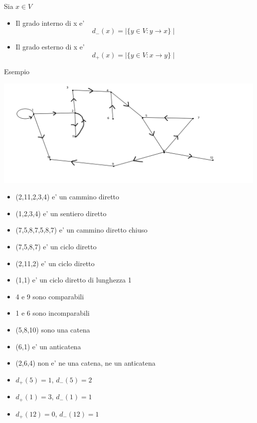 \documentclass{article}
\begin{document}
        \begin{flushleft}
          Sia $x\in V$
        \end{flushleft}
        \begin{itemize}
          \item Il grado interno di x e'
            \begin{equation*}
              d_-(x)=\mid \{ y\in V:y \to x\} \mid
            \end{equation*}
          \item Il grado esterno di x e'
            \begin{equation*}
              d_+(x)=\mid \{y\in V:x\to y\} \mid
            \end{equation*}
        \end{itemize}
        \begin{flushleft}
          Esempio 
        \end{flushleft}
        \includegraphics[bb=0 0 400 200]{pic/grafodirettoes.png}
        \begin{itemize}
          \item (2,11,2,3,4) e' un cammino diretto
          \item (1,2,3,4) e' un sentiero diretto
          \item (7,5,8,7,5,8,7) e' un cammino diretto chiuso
          \item (7,5,8,7) e' un ciclo diretto
          \item (2,11,2) e' un ciclo diretto
          \item (1,1) e' un ciclo diretto di lunghezza 1
          \item 4 e 9 sono comparabili
          \item 1 e 6 sono incomparabili
          \item (5,8,10) sono una catena
          \item (6,1) e' un anticatena
          \item (2,6,4) non e' ne una catena, ne un anticatena
          \item $d_+(5)=1$, $d_-(5)=2$
          \item $d_+(1)=3$, $d_-(1)=1$
          \item $d_+(12)=0$, $d_-(12)=1$
        \end{itemize}
\end{document}
